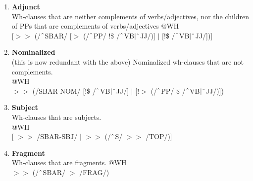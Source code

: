 \begin{enumerate}
\begin{enumerate}
            \item \textbf{Adjunct}\\ 
            Wh-clauses that are neither complements of verbs/adjectives, nor the children of PPs that are complements of verbs/adjectives
            @WH\\
            {}[$>\!\!>$ (/$\string^$SBAR/ [$>$ (/$\string^$PP/ !\$ /$\string^$VB$|\string^$JJ/)] $|$ [!\$ /$\string^$VB$|\string^$JJ/])]

            \item \textbf{Nominalized}\\
            (this is now redundant with the above)
            Nominalized wh-clauses that are not complements.\\
            @WH \\
            $>\!\!>$ (/SBAR-NOM/ [!\$ /$\string^$VB$|\string^$JJ/] $|$ [!$>$ (/$\string^$PP/ \$ /$\string^$VB$|\string^$JJ/)])

            \item \textbf{Subject}\\
            Wh-clauses that are subjects.\\
             @WH \\
            {}[ $>\!\!>$ /SBAR-SBJ/ $|$ $>\!\!>$ (/$\string^$S/ $>\!\!>$ /TOP/)]

            \item \textbf{Fragment}\\
            Wh-clauses that are fragments.
             @WH \\
            $>\!\!>$ (/$\string^$SBAR/ $>$ /FRAG/)
            

\end{enumerate}
\end{enumerate}
